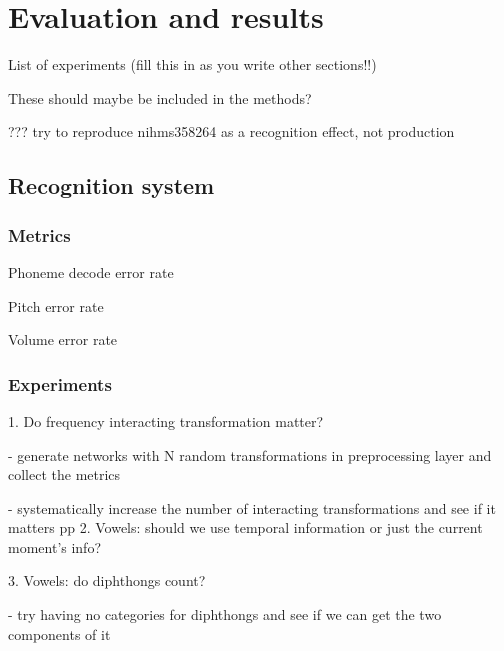 \chapter{Evaluation and results}




List of experiments (fill this in as you write other sections!!)

These should maybe be included in the methods?

??? try to reproduce nihms358264 as a recognition effect, not production

\section{Recognition system}

\subsection{Metrics}

Phoneme decode error rate

Pitch error rate

Volume error rate

\subsection{Experiments}

1. Do frequency interacting transformation matter?

- generate networks with N random transformations
  in preprocessing layer and collect the metrics

- systematically increase the number of interacting
  transformations and see if it matters
pp
2. Vowels: should we use temporal information or just
   the current moment's info?

3. Vowels: do diphthongs count?

- try having no categories for diphthongs and see if
  we can get the two components of it

